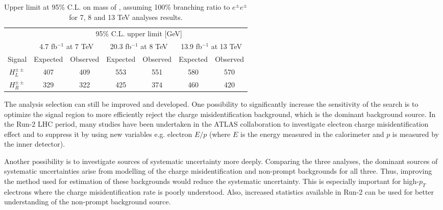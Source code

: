 \begin{table*}[]
\begin{center}
\begin{tabular}{c||c|c||c|c||c|c}

 & \multicolumn{6}{c}{95\%  C.L. upper limit [GeV]} \\
 & \multicolumn{2}{c||}{4.7 fb$^{-1}$ at 7 TeV} & \multicolumn{2}{c||}{20.3 fb$^{-1}$ at 8 TeV} & \multicolumn{2}{c}{13.9 fb$^{-1}$ at 13 TeV} \\
 \hline
Signal & Expected & Observed & Expected & Observed & Expected & Observed \\
\hline
\rule{0pt}{3ex}

$H^{\pm\pm}_L$ & 407 & 409 & 553 & 551 & 580 & 570 \\
\hline
$H^{\pm\pm}_R$ & 329 & 322 & 425 & 374 & 460 & 420 \\
\end{tabular}
\end{center}
 \caption{Upper limit at 95\% C.L. on mass of \dch, assuming 100\% branching ratio to $e^{\pm}e^{\pm}$ for 7, 8 and 13 TeV analyses results.}
\label{tab:DCH_limit_vs_years}
\end{table*}

The analysis selection can still be improved and developed.
One possibility to significantly increase the sensitivity of the search is to optimize the signal region to more efficiently reject the charge misidentification background, which is the dominant background source. In the Run-2 LHC period, many studies have been undertaken in the ATLAS collaboration to investigate electron charge misidentification effect and to suppress it by using new variables e.g. electron $E/p$ (where $E$ is the energy measured in the calorimeter and $p$ is measured by the inner detector).

Another possibility is to investigate sources of systematic uncertainty more deeply.
Comparing the three analyses, the dominant sources of systematic uncertainties arise from modelling of the charge misidentification and non-prompt backgrounds for all three. Thus, improving the method used for estimation of these backgrounds would reduce the systematic uncertainty. This is especially important for high-$p_T$ electrons where the charge misidentification rate is poorly understood.
Also, increased statistics available in Run-2 can be used for better understanding of the non-prompt background source.

